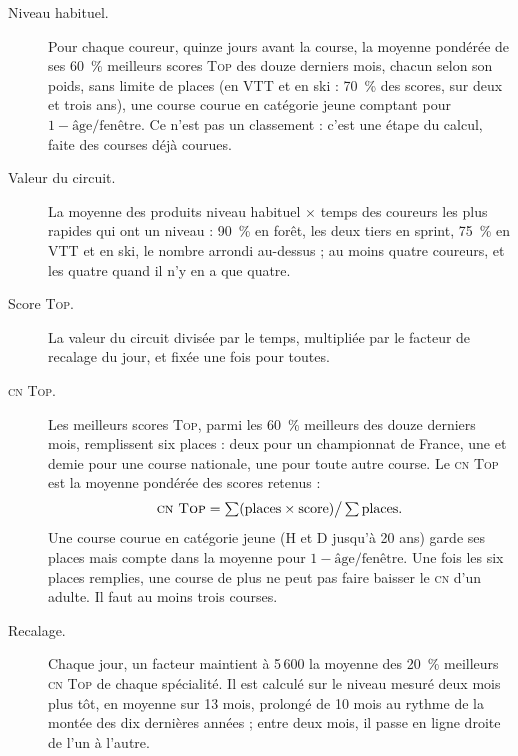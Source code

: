 \documentclass[11pt,a4paper]{article}
\newcommand{\Top}{\textsc{Top}}
\newcommand{\CN}{\textsc{cn}}
\begin{document}
\begin{description}
  \item[Niveau habituel.] Pour chaque coureur, quinze jours avant la course, la moyenne pondérée de ses 60~\% meilleurs scores \Top{} des douze derniers mois, chacun selon son poids, sans limite de places (en VTT et en ski : 70~\% des scores, sur deux et trois ans), une course courue en catégorie jeune comptant pour $1 - \text{âge} / \text{fenêtre}$. Ce n'est pas un classement : c'est une étape du calcul, faite des courses déjà courues.
  \item[Valeur du circuit.] La moyenne des produits niveau habituel $\times$ temps des coureurs les plus rapides qui ont un niveau : 90~\% en forêt, les deux tiers en sprint, 75~\% en VTT et en ski, le nombre arrondi au-dessus ; au moins quatre coureurs, et les quatre quand il n'y en a que quatre.
  \item[Score \Top.] La valeur du circuit divisée par le temps, multipliée par le facteur de recalage du jour, et fixée une fois pour toutes.
  \item[\CN{} \Top.] Les meilleurs scores \Top, parmi les 60~\% meilleurs des douze derniers mois, remplissent six places : deux pour un championnat de France, une et demie pour une course nationale, une pour toute autre course. Le \CN{} \Top{} est la moyenne pondérée des scores retenus :
  \[ \text{\CN{} \Top} = \textstyle\sum (\text{places} \times \text{score}) \big/ \sum \text{places} . \]
  Une course courue en catégorie jeune (H et D jusqu'à 20 ans) garde ses places mais compte dans la moyenne pour $1 - \text{âge} / \text{fenêtre}$. Une fois les six places remplies, une course de plus ne peut pas faire baisser le \CN{} d'un adulte. Il faut au moins trois courses.
  \item[Recalage.] Chaque jour, un facteur maintient à 5\,600 la moyenne des 20~\% meilleurs \CN{} \Top{} de chaque spécialité. Il est calculé sur le niveau mesuré deux mois plus tôt, en moyenne sur 13 mois, prolongé de 10 mois au rythme de la montée des dix dernières années ; entre deux mois, il passe en ligne droite de l'un à l'autre.
\end{description}
\end{document}
